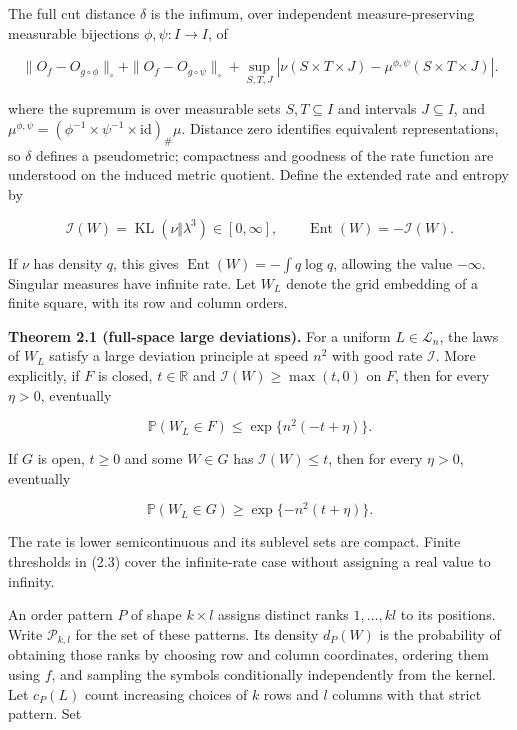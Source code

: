 \documentclass[english,11pt,a4paper]{article}
\begin{document}
The full cut distance \(\delta\) is the infimum, over independent measure-preserving measurable bijections \(\phi,\psi:I\to I\), of

\nopagebreak[4]
\[\|O_f-O_{g\circ\phi}\|_\square+
\|O_f-O_{g\circ\psi}\|_\square+
\sup_{S,T,J}|\nu(S\times T\times J)-\mu^{\phi,\psi}(S\times T\times J)|.\tag{2.1}\]

where the supremum is over measurable sets \(S,T\subseteq I\) and intervals \(J\subseteq I\), and \(\mu^{\phi,\psi}=(\phi^{-1}\times\psi^{-1}\times\mathrm{id})_\#\mu\). Distance zero identifies equivalent representations, so \(\delta\) defines a pseudometric; compactness and goodness of the rate function are understood on the induced metric quotient. Define the extended rate and entropy by

\nopagebreak[4]
\[\mathcal I(W)=\operatorname{KL}(\nu\Vert\lambda^3)\in[0,\infty],
\qquad \operatorname{Ent}(W)=-\mathcal I(W).\tag{2.2}\]

If \(\nu\) has density \(q\), this gives \(\operatorname{Ent}(W)=-\int q\log q\), allowing the value \(-\infty\). Singular measures have infinite rate. Let \(W_L\) denote the grid embedding of a finite square, with its row and column orders.

\textbf{Theorem 2.1 (full-space large deviations).} For a uniform \(L\in\mathcal L_n\), the laws of \(W_L\) satisfy a large deviation principle at speed \(n^2\) with good rate \(\mathcal I\). More explicitly, if \(F\) is closed, \(t\in\mathbb R\) and \(\mathcal I(W)\ge\max(t,0)\) on \(F\), then for every \(\eta>0\), eventually

\nopagebreak[4]
\[\mathbb P(W_L\in F)\le\exp\{n^2(-t+\eta)\}.\tag{2.3}\]

If \(G\) is open, \(t\ge0\) and some \(W\in G\) has \(\mathcal I(W)\le t\), then for every \(\eta>0\), eventually

\nopagebreak[4]
\[\mathbb P(W_L\in G)\ge\exp\{-n^2(t+\eta)\}.\tag{2.4}\]

The rate is lower semicontinuous and its sublevel sets are compact. Finite thresholds in (2.3) cover the infinite-rate case without assigning a real value to infinity.

An order pattern \(P\) of shape \(k\times l\) assigns distinct ranks \(1,\ldots,kl\) to its positions. Write \(\mathcal P_{k,l}\) for the set of these patterns. Its density \(d_P(W)\) is the probability of obtaining those ranks by choosing row and column coordinates, ordering them using \(f\), and sampling the symbols conditionally independently from the kernel. Let \(c_P(L)\) count increasing choices of \(k\) rows and \(l\) columns with that strict pattern. Set
\end{document}
